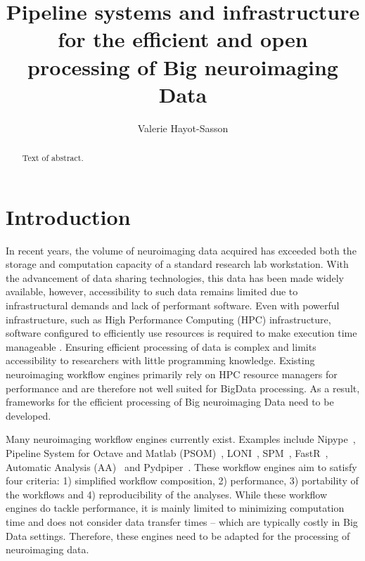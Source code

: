 \documentclass{report}
\begin{document}
 
    \title{Pipeline systems and infrastructure for the efficient
            and open processing of Big neuroimaging Data} 
    \author{Valerie Hayot-Sasson}
    \maketitle 
    
    \begin{abstract} Text of abstract.  
    \end{abstract} 
    \tableofcontents
    \chapter{Introduction}
        In recent years, the volume of neuroimaging data acquired has exceeded
        both the storage and computation capacity of a standard research 
        lab workstation. With the advancement of data sharing technologies, 
        this data has been made widely available, however, accessibility to 
        such data remains limited due to infrastructural demands and lack of 
        performant software. Even with powerful infrastructure, such as High
        Performance Computing (HPC) infrastructure, software configured to 
        efficiently use resources is required to make execution time manageable
        . Ensuring efficient processing of data is 
        complex and limits accessibility to researchers with little programming 
        knowledge. Existing neuroimaging workflow engines primarily rely on HPC
        resource managers for performance and are therefore not well suited for
        BigData processing. As a result, frameworks for the efficient 
        processing of Big neuroimaging Data need to be developed.
        
        Many neuroimaging workflow engines currently exist. Examples include
        Nipype~\cite{nipype}, Pipeline System for Octave and Matlab 
        (PSOM)~\cite{10.3389/fninf.2012.00007}, LONI~\cite{REX20031033}, 
        SPM~\cite{spm}, FastR~\cite{10.3389/fict.2016.00015},
        Automatic Analysis (AA)~\cite{10.3389/fninf.2014.00090} and 
        Pydpiper~\cite{10.3389/fninf.2014.00067}. These 
        workflow engines aim to satisfy four criteria: 1) simplified
        workflow composition, 2) performance, 3) portability of the workflows 
        and 4) reproducibility of the analyses. While these workflow engines
        do tackle performance, it is mainly limited to minimizing computation
        time and does not consider data transfer times -- which are typically
        costly in Big Data settings. Therefore, these engines need to be adapted
        for the processing of neuroimaging data.
\end{document}
